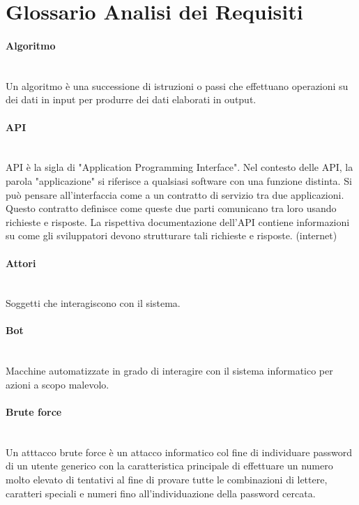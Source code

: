 \section{Glossario Analisi dei Requisiti}

\paragraph{Algoritmo}~\smallskip \\
Un algoritmo è una successione di istruzioni o passi che effettuano operazioni su dei dati in input per produrre dei dati elaborati in output.

\paragraph{API}~\smallskip \\
API è la sigla di "Application Programming Interface". Nel contesto delle API, la parola "applicazione" si riferisce a qualsiasi software con una funzione distinta. Si può pensare all'interfaccia come a un contratto di servizio tra due applicazioni. Questo contratto definisce come queste due parti comunicano tra loro usando richieste e risposte. La rispettiva documentazione dell'API contiene informazioni su come gli sviluppatori devono strutturare tali richieste e risposte. (internet)

\paragraph{Attori}~\smallskip \\
Soggetti che interagiscono con il sistema.

\paragraph{Bot}~\smallskip \\
Macchine automatizzate in grado di interagire con il sistema informatico per azioni a scopo malevolo.

\paragraph{Brute force}~\smallskip \\
Un atttacco brute force è un attacco informatico col fine di individuare password di un utente generico con la caratteristica principale di effettuare un numero molto elevato di tentativi al fine di provare tutte le combinazioni di lettere, caratteri speciali e numeri fino all'individuazione della password cercata.

